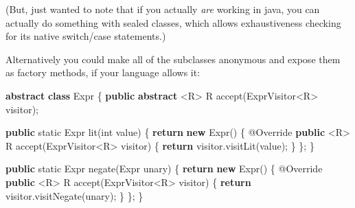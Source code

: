 \documentclass[]{article}
\newenvironment{Shaded}{}{}
\newcommand{\AttributeTok}[1]{\textcolor[rgb]{0.49,0.56,0.16}{#1}}
\newcommand{\ControlFlowTok}[1]{\textcolor[rgb]{0.00,0.44,0.13}{\textbf{#1}}}
\newcommand{\DataTypeTok}[1]{\textcolor[rgb]{0.56,0.13,0.00}{#1}}
\newcommand{\FunctionTok}[1]{\textcolor[rgb]{0.02,0.16,0.49}{#1}}
\newcommand{\KeywordTok}[1]{\textcolor[rgb]{0.00,0.44,0.13}{\textbf{#1}}}
\newcommand{\NormalTok}[1]{#1}
\newcommand{\OperatorTok}[1]{\textcolor[rgb]{0.40,0.40,0.40}{#1}}
\begin{document}
(But, just wanted to note that if you actually \emph{are} working in java, you
can actually do something with sealed classes, which allows exhaustiveness
checking for its native switch/case statements.)

Alternatively you could make all of the subclasses anonymous and expose them as
factory methods, if your language allows it:

\begin{Shaded}
\begin{Highlighting}[]
\KeywordTok{abstract} \KeywordTok{class}\NormalTok{ Expr }\OperatorTok{\{}
    \KeywordTok{public} \KeywordTok{abstract} \OperatorTok{\textless{}}\NormalTok{R}\OperatorTok{\textgreater{}}\NormalTok{ R }\FunctionTok{accept}\OperatorTok{(}\NormalTok{ExprVisitor}\OperatorTok{\textless{}}\NormalTok{R}\OperatorTok{\textgreater{}}\NormalTok{ visitor}\OperatorTok{);}

    \KeywordTok{public} \DataTypeTok{static}\NormalTok{ Expr }\FunctionTok{lit}\OperatorTok{(}\DataTypeTok{int}\NormalTok{ value}\OperatorTok{)} \OperatorTok{\{}
        \ControlFlowTok{return} \KeywordTok{new} \FunctionTok{Expr}\OperatorTok{()} \OperatorTok{\{}
            \AttributeTok{@Override}
            \KeywordTok{public} \OperatorTok{\textless{}}\NormalTok{R}\OperatorTok{\textgreater{}}\NormalTok{ R }\FunctionTok{accept}\OperatorTok{(}\NormalTok{ExprVisitor}\OperatorTok{\textless{}}\NormalTok{R}\OperatorTok{\textgreater{}}\NormalTok{ visitor}\OperatorTok{)} \OperatorTok{\{}
                \ControlFlowTok{return}\NormalTok{ visitor}\OperatorTok{.}\FunctionTok{visitLit}\OperatorTok{(}\NormalTok{value}\OperatorTok{);}
            \OperatorTok{\}}
        \OperatorTok{\};}
    \OperatorTok{\}}

    \KeywordTok{public} \DataTypeTok{static}\NormalTok{ Expr }\FunctionTok{negate}\OperatorTok{(}\NormalTok{Expr unary}\OperatorTok{)} \OperatorTok{\{}
        \ControlFlowTok{return} \KeywordTok{new} \FunctionTok{Expr}\OperatorTok{()} \OperatorTok{\{}
            \AttributeTok{@Override}
            \KeywordTok{public} \OperatorTok{\textless{}}\NormalTok{R}\OperatorTok{\textgreater{}}\NormalTok{ R }\FunctionTok{accept}\OperatorTok{(}\NormalTok{ExprVisitor}\OperatorTok{\textless{}}\NormalTok{R}\OperatorTok{\textgreater{}}\NormalTok{ visitor}\OperatorTok{)} \OperatorTok{\{}
                \ControlFlowTok{return}\NormalTok{ visitor}\OperatorTok{.}\FunctionTok{visitNegate}\OperatorTok{(}\NormalTok{unary}\OperatorTok{);}
            \OperatorTok{\}}
        \OperatorTok{\};}
    \OperatorTok{\}}


\end{Highlighting}
\end{Shaded}
\end{document}
